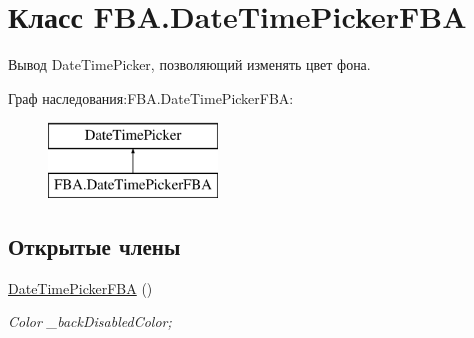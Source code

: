 \hypertarget{class_f_b_a_1_1_date_time_picker_f_b_a}{}\section{Класс F\+B\+A.\+Date\+Time\+Picker\+F\+BA}
\label{class_f_b_a_1_1_date_time_picker_f_b_a}


Вывод Date\+Time\+Picker, позволяющий изменять цвет фона.  


Граф наследования\+:F\+B\+A.\+Date\+Time\+Picker\+F\+BA\+:\begin{figure}[H]
\begin{center}
\leavevmode
\includegraphics[height=2.000000cm]{class_f_b_a_1_1_date_time_picker_f_b_a}
\end{center}
\end{figure}
\subsection*{Открытые члены}
\begin{DoxyCompactItemize}
\item 
\mbox{\hyperlink{class_f_b_a_1_1_date_time_picker_f_b_a_a623bbcddcf5145941afe2d87e51749a5}{Date\+Time\+Picker\+F\+BA}} ()
\begin{DoxyCompactList}\small\item\em Color \+\_\+back\+Disabled\+Color; \end{DoxyCompactList}\end{DoxyCompactItemize}
